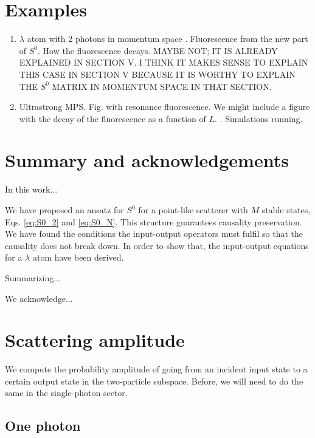 \documentclass[notitlepage, prx, preprint, amsmath,superscriptaddress,amssymb]{revtex4-1}
\begin{document}
\section{Examples}

{\color{blue}
\begin{enumerate}
\item $\lambda$ atom with 2 photons in momentum space \cite{Xu2016}. Fluorescence from the new part of $S^0$. How the fluorescence decays. MAYBE NOT; IT IS ALREADY EXPLAINED IN SECTION V. I THINK IT MAKES SENSE TO EXPLAIN THIS CASE IN SECTION V BECAUSE IT IS WORTHY TO EXPLAIN THE $S^0$ MATRIX IN MOMENTUM SPACE IN THAT SECTION.
\item Ultrastrong MPS. Fig. with resonance fluorescence. We might include a figure with the decay of the fluorescence as a function of $L$. \cite{Sanchez-Burillo2014,Sanchez-Burillo2015}. Simulations running.
\end{enumerate}
}

\section{Summary and acknowledgements}

In this work...

We have proposed an ansatz for $S^0$ for a point-like scatterer with $M$ stable states, Eqs. \eqref{eq:S0_2} and \eqref{eq:S0_N}. This structure guarantees causality preservation. We have found the conditions the input-output operators must fulfil so that the causality does not break down. In order to show that, the input-output equations for a $\lambda$ atom have been derived.

Summarizing...

We acknowledge...

\appendix

\section{Scattering amplitude}\label{app:A}

We compute the probability amplitude of going from an incident input state to a certain output state in the two-particle subspace. Before, we will need to do the same in the single-photon sector. 

\subsection{One photon}
\end{document}
